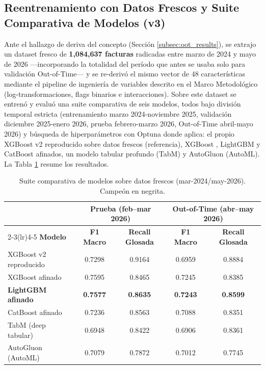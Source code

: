\documentclass[12pt,letterpaper]{report}
\begin{document}
\subsection{Reentrenamiento con Datos Frescos y Suite Comparativa de Modelos (v3)}
\label{subsec:suite_v3}
Ante el hallazgo de deriva del concepto (Sección \ref{subsec:oot_results}), se extrajo un dataset fresco de \textbf{1,084,637 facturas} radicadas entre marzo de 2024 y mayo de 2026 —incorporando la totalidad del período que antes se usaba solo para validación Out-of-Time— y se re-derivó el mismo vector de 48 características mediante el pipeline de ingeniería de variables descrito en el Marco Metodológico (log-transformaciones, flags binarios e interacciones). Sobre este dataset se entrenó y evaluó una suite comparativa de seis modelos, todos bajo división temporal estricta (entrenamiento marzo 2024-noviembre 2025, validación diciembre 2025-enero 2026, prueba febrero-marzo 2026, Out-of-Time abril-mayo 2026) y búsqueda de hiperparámetros con Optuna \cite{akiba2019optuna} donde aplica: el propio XGBoost v2 reproducido sobre datos frescos (referencia), XGBoost \cite{chen2016xgboost}, LightGBM \cite{ke2017lightgbm} y CatBoost afinados, un modelo tabular profundo (TabM) y AutoGluon (AutoML). La Tabla \ref{tab:suite_v3} resume los resultados.

\begin{table}[H]
\centering
\caption{Suite comparativa de modelos sobre datos frescos (mar-2024/may-2026). Campeón en negrita.}
\label{tab:suite_v3}
\small
\begin{tabular}{@{}lcccc@{}}
\toprule
 & \multicolumn{2}{c}{\textbf{Prueba (feb--mar 2026)}} & \multicolumn{2}{c}{\textbf{Out-of-Time (abr--may 2026)}} \\
\cmidrule(lr){2-3}\cmidrule(lr){4-5}
\textbf{Modelo} & \textbf{F1 Macro} & \textbf{Recall Glosada} & \textbf{F1 Macro} & \textbf{Recall Glosada} \\
\midrule
XGBoost v2 reproducido & 0.7298 & 0.9164 & 0.6959 & 0.8884 \\
XGBoost afinado & 0.7595 & 0.8465 & 0.7245 & 0.8385 \\
\textbf{LightGBM afinado} & \textbf{0.7577} & \textbf{0.8635} & \textbf{0.7243} & \textbf{0.8599} \\
CatBoost afinado & 0.7236 & 0.8563 & 0.7088 & 0.8351 \\
TabM (deep tabular) & 0.6948 & 0.8422 & 0.6906 & 0.8361 \\
AutoGluon (AutoML)\footnotemark & 0.7079 & 0.7872 & 0.7012 & 0.7745 \\
\bottomrule
\end{tabular}
\end{table}
\end{document}
